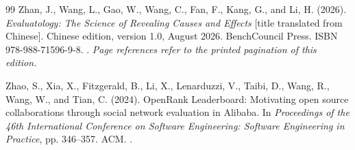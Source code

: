 \begin{thebibliography}{99}
Zhan, J., Wang, L., Gao, W., Wang, C., Fan, F., Kang, G., and Li, H. (2026).
\emph{Evaluatology: The Science of Revealing Causes and Effects} [title translated from Chinese].
Chinese edition, version 1.0, August 2026. BenchCouncil Press.
ISBN 978-988-71596-9-8. .
\emph{Page references refer to the printed pagination of this edition.}

Zhao, S., Xia, X., Fitzgerald, B., Li, X., Lenarduzzi, V., Taibi, D., Wang, R., Wang, W., and Tian, C. (2024).
OpenRank Leaderboard: Motivating open source collaborations through social network evaluation in Alibaba.
In \emph{Proceedings of the 46th International Conference on Software Engineering: Software Engineering in Practice}, pp. 346--357. ACM.
.
\end{thebibliography}
\endgroup
